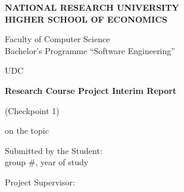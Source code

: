 %
\begin{titlepage}
\thispagestyle{empty}
\singlespacing
\footnotesize
\setlength{\parindent}{0pt}
\setlength{\parskip}{0pt}


\begin{center}
\textbf{NATIONAL RESEARCH UNIVERSITY}\\
\textbf{HIGHER SCHOOL OF ECONOMICS}

\vspace{0.35cm}
Faculty of Computer Science\\
Bachelor's Programme ``Software Engineering''
\end{center}

\vspace{0.3cm}
\noindent
UDC~\hseUDC

\vspace{1.6cm}
\begin{center}
\textbf{\normalsize Research Course Project Interim Report}

\vspace{0.12cm}
(Checkpoint 1)

\vspace{0.45cm}
on the topic
\underline{\makebox[0.9\textwidth][c]{\hseProjectName}}
\end{center}

\vspace{1.4cm}
\noindent
\begin{minipage}[t]{0.5\textwidth}
\raggedright
Submitted by the Student:\\
group \#\hseGroup, \hseCourse{} year of study

\vspace{0.25cm}
\strut\hseAuthorName
\end{minipage}

\vspace{0.9cm}
\noindent
\begin{minipage}[t]{0.7\textwidth}
\raggedright
Project Supervisor:\\
\strut\hseSupervisorName\\
\strut\hseSupervisorTitle
\end{minipage}

\vfill
\begin{center}
\textbf{\hseCityEn{} \hseYear}
\end{center}

\end{titlepage}

\setcounter{page}{2}
\clearpage
